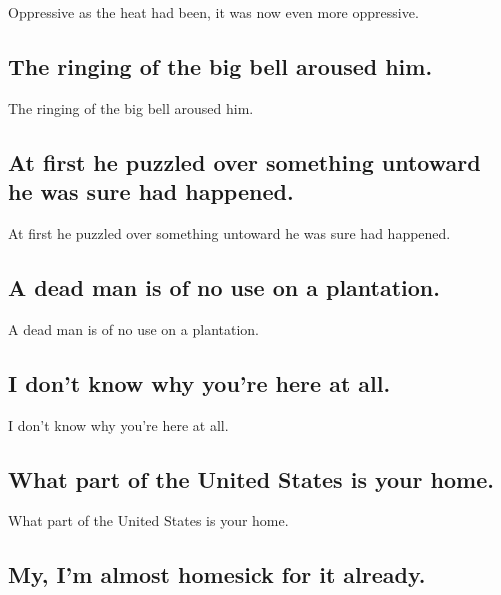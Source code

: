 \documentclass[]{article}
\begin{document}
Oppressive as the heat had been, it was now even more oppressive.

\hypertarget{the-ringing-of-the-big-bell-aroused-him.}{%
\subsection{The ringing of the big bell aroused
him.}\label{the-ringing-of-the-big-bell-aroused-him.}}

The ringing of the big bell aroused him.

\hypertarget{at-first-he-puzzled-over-something-untoward-he-was-sure-had-happened.}{%
\subsection{At first he puzzled over something untoward he was sure had
happened.}\label{at-first-he-puzzled-over-something-untoward-he-was-sure-had-happened.}}

At first he puzzled over something untoward he was sure had happened.

\hypertarget{a-dead-man-is-of-no-use-on-a-plantation.}{%
\subsection{A dead man is of no use on a
plantation.}\label{a-dead-man-is-of-no-use-on-a-plantation.}}

A dead man is of no use on a plantation.

\hypertarget{i-dont-know-why-youre-here-at-all.}{%
\subsection{I don't know why you're here at
all.}\label{i-dont-know-why-youre-here-at-all.}}

I don't know why you're here at all.

\hypertarget{what-part-of-the-united-states-is-your-home.}{%
\subsection{What part of the United States is your
home.}\label{what-part-of-the-united-states-is-your-home.}}

What part of the United States is your home.

\hypertarget{my-im-almost-homesick-for-it-already.}{%
\subsection{My, I'm almost homesick for it
already.}\label{my-im-almost-homesick-for-it-already.}}
\end{document}
